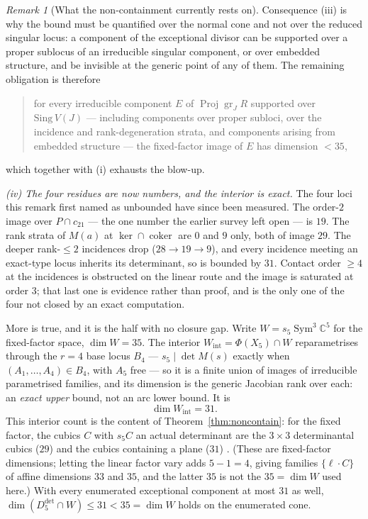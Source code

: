 \documentclass[11pt]{amsart}
\theoremstyle{plain}
\theoremstyle{definition}
\theoremstyle{remark}
\newtheorem{remark}[theorem]{Remark}
\DeclareMathOperator{\Sym}{Sym}
\newcommand{\bC}{\mathbb{C}}
\newcommand{\Pp}{P}
\newcommand{\Ddet}{D^{\det}}
\begin{document}
\begin{remark}[What the non-containment currently rests on]
Consequence (iii) is why the bound must be quantified over the normal cone and
not over the reduced singular locus: a component of the exceptional divisor can
be supported over a proper sublocus of an irreducible singular component, or
over embedded structure, and be invisible at the generic point of any of them.
The remaining obligation is therefore

\begin{quote}
for every irreducible component $E$ of $\operatorname{Proj}\operatorname{gr}_J R$
supported over $\mathrm{Sing}\,V(J)$ --- including components over proper
subloci, over the incidence and rank-degeneration strata, and components arising
from embedded structure --- the fixed-factor image of $E$ has dimension $<35$,
\end{quote}

which together with (i) exhausts the blow-up.

\emph{(iv) The four residues are now numbers, and the interior is exact.}  The
four loci this remark first named as unbounded have since been measured.  The
order-$2$ image over $\Pp\cap c_{21}$ --- the one number the earlier survey left
open --- is $19$.  The rank strata of $M(a)$ at $\ker\cap\operatorname{coker}$
are $0$ and $9$ only, both of image $29$.  The deeper rank-$\le2$ incidences
drop ($28\to19\to9$), and every incidence meeting an exact-type locus inherits
its determinant, so is bounded by $31$.  Contact order $\ge4$ at the incidences
is obstructed on the linear route and the image is saturated at order $3$; that
last one is evidence rather than proof, and is the only one of the four not
closed by an exact computation.

More is true, and it is the half with no closure gap.  Write
$W=s_5\Sym^{3}\bC^{5}$ for the fixed-factor space, $\dim W=35$.  The interior
$W_{\mathrm{int}}=\Phi(X_5)\cap W$ reparametrises through the $r=4$ base locus
$B_4$ --- $s_5\mid\det M(s)$ exactly when $(A_1,\dots,A_4)\in B_4$, with $A_5$
free --- so it is a finite union of images of irreducible parametrised families,
and its dimension is the generic Jacobian rank over each: an \emph{exact upper}
bound, not an arc lower bound.  It is
\[
  \dim W_{\mathrm{int}} = 31 .
\]
This interior count is the content of Theorem~\ref{thm:noncontain}: for the
fixed factor, the cubics $C$ with $s_5C$ an actual determinant are the
$3\times3$ determinantal cubics ($29$) and the cubics containing a plane
($31$) \cite{Companion3}.  (These are fixed-factor dimensions; letting the linear factor vary
adds $5-1=4$, giving families $\{\ell\cdot C\}$ of affine dimensions $33$ and $35$, and the
latter $35$ is not the $35=\dim W$ used here.)  With every enumerated exceptional component at
most $31$ as well,
$\dim(\Ddet_5\cap W)\le31<35=\dim W$ holds on the enumerated cone.


\end{remark}
\end{document}
